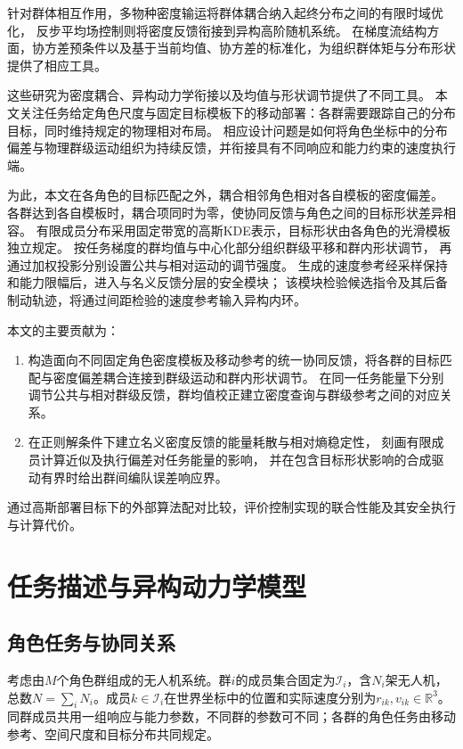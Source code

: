 \documentclass[UTF8,a4paper,11pt,fontset=none]{ctexart}
\newcommand{\R}{\mathbb R}\newcommand{\KL}{\operatorname{KL}}
\begin{document}
针对群体相互作用，多物种密度输运将群体耦合纳入起终分布之间的有限时域优化\cite{chen2024}，
反步平均场控制则将密度反馈衔接到异构高阶随机系统\cite{zheng2022backstep}。
在梯度流结构方面，协方差预条件以及基于当前均值、协方差的标准化，为组织群体矩与分布形状提供了相应工具\cite{garbuno2020,burger2025}。

这些研究为密度耦合、异构动力学衔接以及均值与形状调节提供了不同工具。
本文关注任务给定角色尺度与固定目标模板下的移动部署：各群需要跟踪自己的分布目标，同时维持规定的物理相对布局。
相应设计问题是如何将角色坐标中的分布偏差与物理群级运动组织为持续反馈，并衔接具有不同响应和能力约束的速度执行端。

为此，本文在各角色的目标匹配之外，耦合相邻角色相对各自模板的密度偏差。
各群达到各自模板时，耦合项同时为零，使协同反馈与角色之间的目标形状差异相容。
有限成员分布采用固定带宽的高斯KDE表示，目标形状由各角色的光滑模板独立规定。
按任务梯度的群均值与中心化部分组织群级平移和群内形状调节，
再通过加权投影分别设置公共与相对运动的调节强度。
生成的速度参考经采样保持和能力限幅后，进入与名义反馈分层的安全模块\cite{wang2016hetero,chen2021backup}；
该模块检验候选指令及其后备制动轨迹，将通过间距检验的速度参考输入异构内环。

本文的主要贡献为：
\begin{enumerate}
\item 构造面向不同固定角色密度模板及移动参考的统一协同反馈，将各群的目标匹配与密度偏差耦合连接到群级运动和群内形状调节。
在同一任务能量下分别调节公共与相对群级反馈，群均值校正建立密度查询与群级参考之间的对应关系。
\item 在正则解条件下建立名义密度反馈的能量耗散与相对熵稳定性，
刻画有限成员计算近似及执行偏差对任务能量的影响，
并在包含目标形状影响的合成驱动有界时给出群间编队误差响应界。
\end{enumerate}
通过高斯部署目标下的外部算法配对比较，评价控制实现的联合性能及其安全执行与计算代价。

\section{任务描述与异构动力学模型}
\subsection{角色任务与协同关系}
考虑由$M$个角色群组成的无人机系统。群$i$的成员集合固定为$\mathcal I_i$，含$N_i$架无人机，
总数$N=\sum_iN_i$。成员$k\in\mathcal I_i$在世界坐标中的位置和实际速度分别为$r_{ik},v_{ik}\in\R^3$。
同群成员共用一组响应与能力参数，不同群的参数可不同；各群的角色任务由移动参考、空间尺度和目标分布共同规定。
\end{document}
